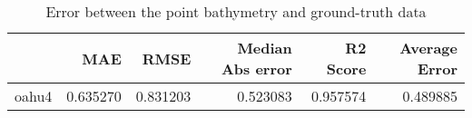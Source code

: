 \begin{table}[h!]
\caption{Error between the point bathymetry and ground-truth data}
\label{tab:oahu4_lidar_error}
\begin{tabular}{lrrrrr}
\toprule
 & MAE & RMSE & Median Abs error & R2 Score & Average Error \\
\midrule
oahu4 & 0.635270 & 0.831203 & 0.523083 & 0.957574 & 0.489885 \\
\bottomrule
\end{tabular}
\end{table}
